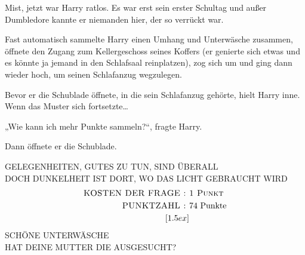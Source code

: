Mist, jetzt war Harry ratlos. Es war erst sein erster Schultag und außer Dumbledore kannte er niemanden hier, der so verrückt war.

Fast automatisch sammelte Harry einen Umhang und Unterwäsche zusammen, öffnete den Zugang zum Kellergeschoss seines Koffers (er genierte sich etwas und es könnte ja jemand in den Schlafsaal reinplatzen), zog sich um und ging dann wieder hoch, um seinen Schlafanzug wegzulegen.

Bevor er die Schublade öffnete, in die sein Schlafanzug gehörte, hielt Harry inne. Wenn das Muster sich fortsetzte…

„Wie kann ich mehr Punkte sammeln?“, fragte Harry.

Dann öffnete er die Schublade.
\begin{writtenNote}\centering
\uppercase{Gelegenheiten, Gutes zu tun, sind überall\\
Doch Dunkelheit ist dort, wo das Licht gebraucht wird}
\begin{align*}
\hbox{\scshape \uppercase{Kosten der Frage}~: }&\hbox{\scshape 1~Punkt}\\
\hbox{\scshape \uppercase{Punktzahl}~: }&\hbox{74 Punkte}\\
[1.5ex]
\end{align*}
{\scshape \uppercase{Schöne Unterwäsche}}\\
{\scshape \uppercase{Hat deine Mutter die ausgesucht}?}
\end{writtenNote}


